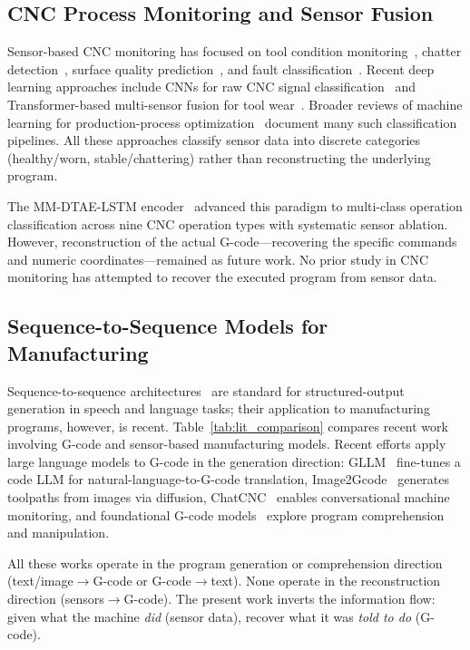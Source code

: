 \documentclass[sensors,article,submit,moreauthors,pdftex]{Definitions/mdpi}
\newcommand{\modelname}{MM-DTAE-LSTM}
\begin{document}
\subsection{CNC Process Monitoring and Sensor Fusion}
\label{sec:related_cnc}

Sensor-based CNC monitoring has focused on tool condition monitoring~\cite{teti2010advanced,mohanraj2020tool}, chatter detection~\cite{zhu2009wavelet}, surface quality prediction~\cite{bergs2020digital}, and fault classification~\cite{serin2020tool}. Recent deep learning approaches include CNNs for raw CNC signal classification~\cite{stathatos2024cnn} and Transformer-based multi-sensor fusion for tool wear~\cite{wang2024multisensor}. Broader reviews of machine learning for production-process optimization~\cite{quality_prediction} document many such classification pipelines. All these approaches classify sensor data into discrete categories (healthy/worn, stable/chattering) rather than reconstructing the underlying program.

The \modelname{} encoder~\cite{encoder_paper} advanced this paradigm to multi-class operation classification across nine CNC operation types with systematic sensor ablation. However, reconstruction of the actual G-code---recovering the specific commands and numeric coordinates---remained as future work. No prior study in CNC monitoring has attempted to recover the executed program from sensor data.

\subsection{Sequence-to-Sequence Models for Manufacturing}
\label{sec:related_s2s}

Sequence-to-sequence architectures~\cite{sutskever2014sequence,vaswani2017attention} are standard for structured-output generation in speech and language tasks; their application to manufacturing programs, however, is recent. Table~\ref{tab:lit_comparison} compares recent work involving G-code and sensor-based manufacturing models. Recent efforts apply large language models to G-code in the generation direction: GLLM~\cite{gllm} fine-tunes a code LLM for natural-language-to-G-code translation, Image2Gcode~\cite{image2gcode} generates toolpaths from images via diffusion, ChatCNC~\cite{chatcnc} enables conversational machine monitoring, and foundational G-code models~\cite{gcode_foundational} explore program comprehension and manipulation.

All these works operate in the program generation or comprehension direction (text/image$\to$G-code or G-code$\to$text). None operate in the reconstruction direction (sensors$\to$G-code). The present work inverts the information flow: given what the machine \emph{did} (sensor data), recover what it was \emph{told to do} (G-code).
\end{document}
